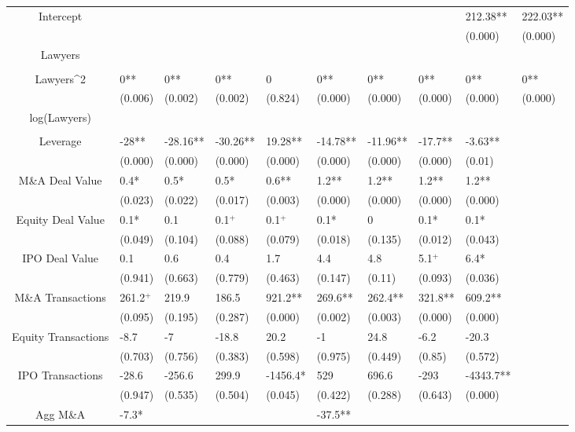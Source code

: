 \documentclass{article}
\begin{document}
\begin{table}[H]
\begin{tabular}{|clllllllll|}
Intercept &  &  &  &  &  &  &  & 212.38** & 222.03** \\ 
   &  &  &  &  &  &  &  & (0.000) & (0.000) \\ 
  Lawyers &  &  &  &  &  &  &  &  &  \\ 
   &  &  &  &  &  &  &  &  &  \\ 
  Lawyers^2 & 0** & 0** & 0** & 0 & 0** & 0** & 0** & 0** & 0** \\ 
   & (0.006) & (0.002) & (0.002) & (0.824) & (0.000) & (0.000) & (0.000) & (0.000) & (0.000) \\ 
  log(Lawyers) &  &  &  &  &  &  &  &  &  \\ 
   &  &  &  &  &  &  &  &  &  \\ 
  Leverage & -28** & -28.16** & -30.26** & 19.28** & -14.78** & -11.96** & -17.7** & -3.63** &  \\ 
   & (0.000) & (0.000) & (0.000) & (0.000) & (0.000) & (0.000) & (0.000) & (0.01) &  \\ 
  M\&A Deal Value & 0.4* & 0.5* & 0.5* & 0.6** & 1.2** & 1.2** & 1.2** & 1.2** &  \\ 
   & (0.023) & (0.022) & (0.017) & (0.003) & (0.000) & (0.000) & (0.000) & (0.000) &  \\ 
  Equity Deal Value & 0.1* & 0.1 & 0.1$^{+}$ & 0.1$^{+}$ & 0.1* & 0 & 0.1* & 0.1* &  \\ 
   & (0.049) & (0.104) & (0.088) & (0.079) & (0.018) & (0.135) & (0.012) & (0.043) &  \\ 
  IPO Deal Value & 0.1 & 0.6 & 0.4 & 1.7 & 4.4 & 4.8 & 5.1$^{+}$ & 6.4* &  \\ 
   & (0.941) & (0.663) & (0.779) & (0.463) & (0.147) & (0.11) & (0.093) & (0.036) &  \\ 
  M\&A Transactions & 261.2$^{+}$ & 219.9 & 186.5 & 921.2** & 269.6** & 262.4** & 321.8** & 609.2** &  \\ 
   & (0.095) & (0.195) & (0.287) & (0.000) & (0.002) & (0.003) & (0.000) & (0.000) &  \\ 
  Equity Transactions & -8.7 & -7 & -18.8 & 20.2 & -1 & 24.8 & -6.2 & -20.3 &  \\ 
   & (0.703) & (0.756) & (0.383) & (0.598) & (0.975) & (0.449) & (0.85) & (0.572) &  \\ 
  IPO Transactions & -28.6 & -256.6 & 299.9 & -1456.4* & 529 & 696.6 & -293 & -4343.7** &  \\ 
   & (0.947) & (0.535) & (0.504) & (0.045) & (0.422) & (0.288) & (0.643) & (0.000) &  \\ 
  Agg M\&A & -7.3* &  &  &  & -37.5** &  &  &  &  \\ 

\end{tabular}
\end{table}
\end{document}

